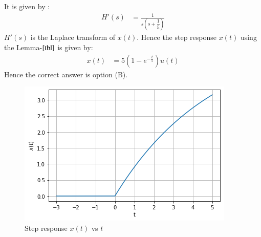 \documentclass[journal,12pt,twocolumn]{IEEEtran}
\begin{document}
It is given by :
\begin{align}
H'(s) &= \frac{1}{s(s + \dfrac{1}{5})}\label{eq:2}
\end{align}
$H'(s)$ is the Laplace transform of $x(t)$. Hence the step response $x(t)$ using the Lemma-$\ref{tbl}$ is given by:
\begin{align}
x(t) &= 5(1-e^{-\frac{t}{5}})u(t)
\end{align}
Hence the correct answer is option (B).
\begin{figure}[!ht]
    \centering
    \includegraphics[width=\columnwidth] {Gate_Assignment_2_Fig_1.png}
    \caption{Step response $x(t)$ vs $t$}
    \label{Step response x(t)}
\end{figure}
\end{document}
